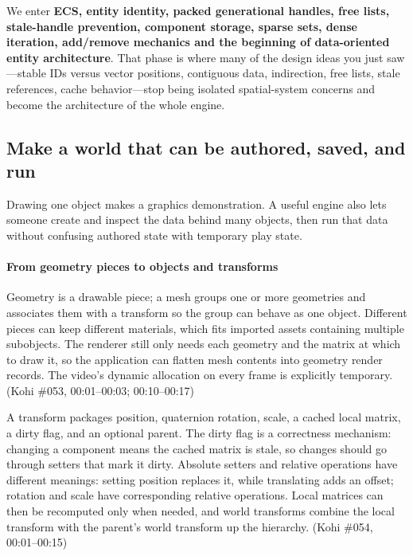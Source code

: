 We enter \textbf{ECS, entity identity, packed generational handles, free lists, stale-handle prevention, component storage, sparse sets, dense iteration, add/remove mechanics and the beginning of data-oriented entity architecture}. That phase is where many of the design ideas you just saw---stable IDs versus vector positions, contiguous data, indirection, free lists, stale references, cache behavior---stop being isolated spatial-system concerns and become the architecture of the whole engine.

\subsection{Make a world that can be authored, saved, and run}\label{make-a-world-that-can-be-authored-saved-and-run}

Drawing one object makes a graphics demonstration. A useful engine also lets someone create and inspect the data behind many objects, then run that data without confusing authored state with temporary play state.

\paragraph{From geometry pieces to objects and transforms}\label{from-geometry-pieces-to-objects-and-transforms}

Geometry is a drawable piece; a mesh groups one or more geometries and associates them with a transform so the group can behave as one object. Different pieces can keep different materials, which fits imported assets containing multiple subobjects. The renderer still only needs each geometry and the matrix at which to draw it, so the application can flatten mesh contents into geometry render records. The video's dynamic allocation on every frame is explicitly temporary. (Kohi \#053, 00:01--00:03; 00:10--00:17)

A transform packages position, quaternion rotation, scale, a cached local matrix, a dirty flag, and an optional parent. The dirty flag is a correctness mechanism: changing a component means the cached matrix is stale, so changes should go through setters that mark it dirty. Absolute setters and relative operations have different meanings: setting position replaces it, while translating adds an offset; rotation and scale have corresponding relative operations. Local matrices can then be recomputed only when needed, and world transforms combine the local transform with the parent's world transform up the hierarchy. (Kohi \#054, 00:01--00:15)

